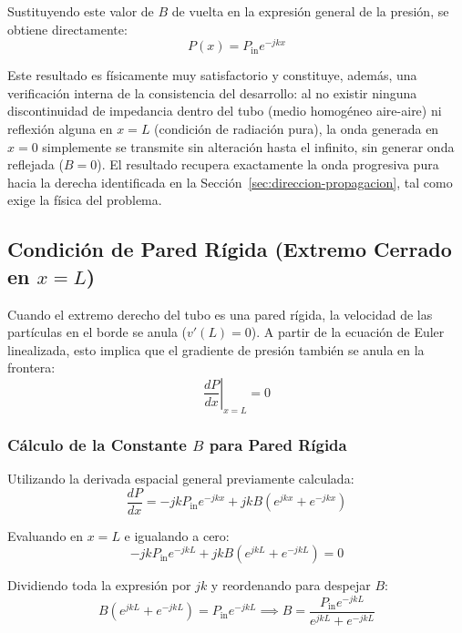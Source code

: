 \documentclass[11pt,letterpaper]{article}
\begin{document}
Sustituyendo este valor de $B$ de vuelta en la expresión general de la presión, se obtiene directamente:
\begin{equation}
    P(x) = P_{\text{in}} e^{-jkx}
\end{equation}

Este resultado es físicamente muy satisfactorio y constituye, además, una verificación interna de la consistencia del desarrollo: al no existir ninguna discontinuidad de impedancia dentro del tubo (medio homogéneo aire-aire) ni reflexión alguna en $x=L$ (condición de radiación pura), la onda generada en $x=0$ simplemente se transmite sin alteración hasta el infinito, sin generar onda reflejada ($B=0$). El resultado recupera exactamente la onda progresiva pura hacia la derecha identificada en la Sección~\ref{sec:direccion-propagacion}, tal como exige la física del problema.

\subsection{Condición de Pared Rígida (Extremo Cerrado en $x = L$)}

Cuando el extremo derecho del tubo es una pared rígida, la velocidad de las partículas en el borde se anula ($v'(L) = 0$). A partir de la ecuación de Euler linealizada, esto implica que el gradiente de presión también se anula en la frontera:
\begin{equation}
    \left. \frac{dP}{dx} \right|_{x=L} = 0
\end{equation}

\subsubsection{Cálculo de la Constante $B$ para Pared Rígida}
Utilizando la derivada espacial general previamente calculada:
\begin{equation}
    \frac{dP}{dx} = -jk P_{\text{in}} e^{-jkx} + jk B (e^{jkx} + e^{-jkx})
\end{equation}

Evaluando en $x = L$ e igualando a cero:
\begin{equation}
    -jk P_{\text{in}} e^{-jkL} + jk B (e^{jkL} + e^{-jkL}) = 0
\end{equation}

Dividiendo toda la expresión por $jk$ y reordenando para despejar $B$:
\begin{equation}
    B (e^{jkL} + e^{-jkL}) = P_{\text{in}} e^{-jkL} \implies B = \frac{P_{\text{in}} e^{-jkL}}{e^{jkL} + e^{-jkL}}
\end{equation}
\end{document}
